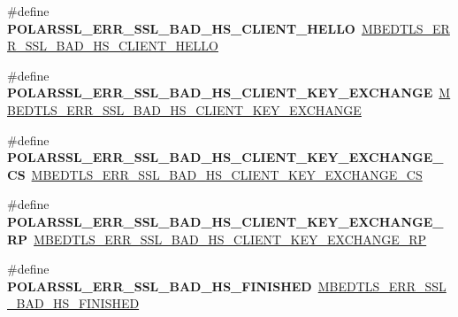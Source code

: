 \begin{DoxyCompactItemize}
\#define {\bfseries P\+O\+L\+A\+R\+S\+S\+L\+\_\+\+E\+R\+R\+\_\+\+S\+S\+L\+\_\+\+B\+A\+D\+\_\+\+H\+S\+\_\+\+C\+L\+I\+E\+N\+T\+\_\+\+H\+E\+L\+LO}~\mbox{\hyperlink{ssl_8h_ac89dc637982bd86c71757c4ec86ddcc0}{M\+B\+E\+D\+T\+L\+S\+\_\+\+E\+R\+R\+\_\+\+S\+S\+L\+\_\+\+B\+A\+D\+\_\+\+H\+S\+\_\+\+C\+L\+I\+E\+N\+T\+\_\+\+H\+E\+L\+LO}}
\item 
\mbox{\label{compat-1_83_8h_a446cd19a186cc2a67f64993af3013fbd}} 
\#define {\bfseries P\+O\+L\+A\+R\+S\+S\+L\+\_\+\+E\+R\+R\+\_\+\+S\+S\+L\+\_\+\+B\+A\+D\+\_\+\+H\+S\+\_\+\+C\+L\+I\+E\+N\+T\+\_\+\+K\+E\+Y\+\_\+\+E\+X\+C\+H\+A\+N\+GE}~\mbox{\hyperlink{ssl_8h_a8de57eeca7485d08d11f5f384a7bf17c}{M\+B\+E\+D\+T\+L\+S\+\_\+\+E\+R\+R\+\_\+\+S\+S\+L\+\_\+\+B\+A\+D\+\_\+\+H\+S\+\_\+\+C\+L\+I\+E\+N\+T\+\_\+\+K\+E\+Y\+\_\+\+E\+X\+C\+H\+A\+N\+GE}}
\item 
\mbox{\label{compat-1_83_8h_aa6cfcd4ac760424f436ce5d023e082c6}} 
\#define {\bfseries P\+O\+L\+A\+R\+S\+S\+L\+\_\+\+E\+R\+R\+\_\+\+S\+S\+L\+\_\+\+B\+A\+D\+\_\+\+H\+S\+\_\+\+C\+L\+I\+E\+N\+T\+\_\+\+K\+E\+Y\+\_\+\+E\+X\+C\+H\+A\+N\+G\+E\+\_\+\+CS}~\mbox{\hyperlink{ssl_8h_af5c8a932814077d04bc22ed51fbddf6a}{M\+B\+E\+D\+T\+L\+S\+\_\+\+E\+R\+R\+\_\+\+S\+S\+L\+\_\+\+B\+A\+D\+\_\+\+H\+S\+\_\+\+C\+L\+I\+E\+N\+T\+\_\+\+K\+E\+Y\+\_\+\+E\+X\+C\+H\+A\+N\+G\+E\+\_\+\+CS}}
\item 
\mbox{\label{compat-1_83_8h_a2726e209ffa43b6c2ce45e22fad0a870}} 
\#define {\bfseries P\+O\+L\+A\+R\+S\+S\+L\+\_\+\+E\+R\+R\+\_\+\+S\+S\+L\+\_\+\+B\+A\+D\+\_\+\+H\+S\+\_\+\+C\+L\+I\+E\+N\+T\+\_\+\+K\+E\+Y\+\_\+\+E\+X\+C\+H\+A\+N\+G\+E\+\_\+\+RP}~\mbox{\hyperlink{ssl_8h_a0038d1d08de609a963b595f423d13841}{M\+B\+E\+D\+T\+L\+S\+\_\+\+E\+R\+R\+\_\+\+S\+S\+L\+\_\+\+B\+A\+D\+\_\+\+H\+S\+\_\+\+C\+L\+I\+E\+N\+T\+\_\+\+K\+E\+Y\+\_\+\+E\+X\+C\+H\+A\+N\+G\+E\+\_\+\+RP}}
\item 
\mbox{\label{compat-1_83_8h_ad5238dfb12be0905ef5243bedf195e9b}} 
\#define {\bfseries P\+O\+L\+A\+R\+S\+S\+L\+\_\+\+E\+R\+R\+\_\+\+S\+S\+L\+\_\+\+B\+A\+D\+\_\+\+H\+S\+\_\+\+F\+I\+N\+I\+S\+H\+ED}~\mbox{\hyperlink{ssl_8h_a30610cf8e029daa83e34ff4ba572002a}{M\+B\+E\+D\+T\+L\+S\+\_\+\+E\+R\+R\+\_\+\+S\+S\+L\+\_\+\+B\+A\+D\+\_\+\+H\+S\+\_\+\+F\+I\+N\+I\+S\+H\+ED}}
\item 
\mbox{\label{compat-1_83_8h_a5303c598a58f4cd226b8ca773e8445ce}} 

\end{DoxyCompactItemize}

